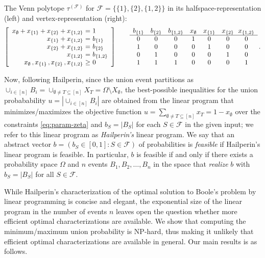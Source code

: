 \documentclass[11pt]{article}
\newcommand{\vp}{\ensuremath{\tau}}
\begin{document}
\begin{example}
\label{exa:vp}
The Venn polytope $\vp^{(\mathcal{F})}$
for $\mathcal{F}=\{\{1\},\{2\},\{1,2\}\}$ in its 
halfspace-representation (left) and vertex-representation (right):
\[
\left[
\begin{array}{r@{\ }c@{\ }l}
x_\emptyset +
x_{\{1\}} +
x_{\{2\}} +
x_{\{1,2\}} & = & 1\\
x_{\{1\}} + x_{\{1,2\}} & = & b_{\{1\}}\\
x_{\{2\}} + x_{\{1,2\}} & = & b_{\{2\}}\\
            x_{\{1,2\}} & = & b_{\{1,2\}}\\
x_\emptyset\,,
x_{\{1\}}\,,
x_{\{2\}}\,,
x_{\{1,2\}} & \geq & 0\\
\end{array}
\right]
\qquad
\begin{array}{cccccc@{\ \ }c}
b_{\{1\}}&
b_{\{2\}}&
b_{\{1,2\}}&
x_\emptyset&
x_{\{1\}}&
x_{\{2\}}&
x_{\{1,2\}}\\\hline
0&0&0&1&0&0&0\\
1&0&0&0&1&0&0\\
0&1&0&0&0&1&0\\
1&1&1&0&0&0&1
\end{array}
\,.
\]
\end{example}
Now, following Hailperin, since the union event partitions as 
$\cup_{i\in[n]}B_i=\cup_{\emptyset\neq T\subseteq[n]}X_T=\Omega\setminus X_\emptyset$, the best-possible inequalities for the union probabability 
$u=|\!\cup_{i\in[n]}B_i|$ are
obtained from the linear program that minimizes/maximizes the objective 
function $u=\sum_{\emptyset\neq T\subseteq[n]}x_T=1-x_\emptyset$ over
the constraints \eqref{eq:param-zeta} and $b_S=|B_S|$ for 
each $S\in\mathcal{F}$ in the given input; we refer to this linear program
as {\em Hailperin's} linear program. We say that an abstract vector
$b=(b_S\in[0,1]:S\in\mathcal{F})$ of probabilities is {\em feasible}
if Hailperin's linear program is feasible. 
In particular, $b$ is feasible if and only if there exists a probability 
space $\Omega$ and $n$ events $B_1,B_2,\ldots,B_n$ in the space 
that {\em realize} $b$ with $b_S=|B_S|$ for all $S\in\mathcal{F}$.

While Hailperin's characterization of the optimal solution to Boole's problem
by linear programming is concise and elegant, 
the exponential size of the linear program in the number of events $n$ leaves 
open the question whether more efficient optimal characterizations are 
available. We show that computing the minimum/maximum union probability 
is NP-hard, thus making it unlikely that efficient optimal characterizations
are available in general. Our main results is as follows.
\end{document}
